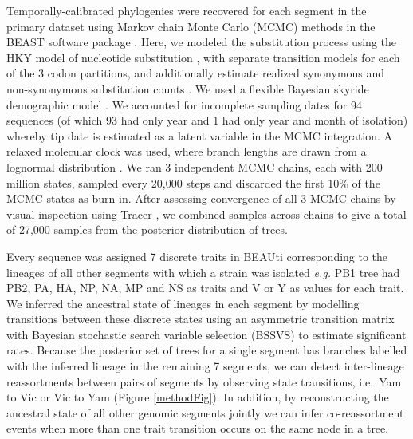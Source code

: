 \documentclass[11pt,oneside,letterpaper]{article}
\begin{document}
Temporally-calibrated phylogenies were recovered for each segment in the primary dataset using Markov chain Monte Carlo (MCMC) methods in the BEAST software package \citep{drummond2012}.
Here, we modeled the substitution process using the HKY model of nucleotide substitution \citep{hky1985}, with separate transition models for each of the 3 codon partitions, and additionally estimate realized synonymous and non-synonymous substitution counts \citep{obrien2009}.
We used a flexible Bayesian skyride demographic model \citep{minin2008}.
We accounted for incomplete sampling dates for 94 sequences (of which 93 had only year and 1 had only year and month of isolation) whereby tip date is estimated as a latent variable in the MCMC integration.
A relaxed molecular clock was used, where branch lengths are drawn from a lognormal distribution \citep{drummond2006}.
We ran 3 independent MCMC chains, each with 200 million states, sampled every 20,000 steps and discarded the first 10\% of the MCMC states as burn-in.
After assessing convergence of all 3 MCMC chains by visual inspection using Tracer \citep{tracer}, we combined samples across chains to give a total of 27,000 samples from the posterior distribution of trees.

Every sequence was assigned 7 discrete traits in BEAUti corresponding to the lineages of all other segments with which a strain was isolated \textit{e.g.} PB1 tree had PB2, PA, HA, NP, NA, MP and NS as traits and V or Y as values for each trait.
We inferred the ancestral state of lineages in each segment by modelling transitions between these discrete states using an asymmetric transition matrix \citep{lemey2009} with Bayesian stochastic search variable selection (BSSVS) to estimate significant rates.
Because the posterior set of trees for a single segment has branches labelled with the inferred lineage in the remaining 7 segments, we can detect inter-lineage reassortments between pairs of segments by observing state transitions, i.e.\ Yam to Vic or Vic to Yam (Figure \ref{methodFig}).
In addition, by reconstructing the ancestral state of all other genomic segments jointly we can infer co-reassortment events when more than one trait transition occurs on the same node in a tree.
\end{document}
